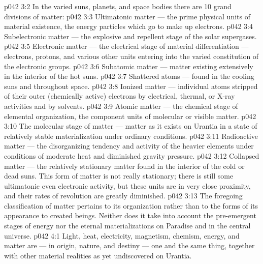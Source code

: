 \vs p042 3:2 In the varied suns, planets, and space bodies there are 10 grand divisions of matter:
\vs p042 3:3 \bibnobreakspace Ultimatonic matter --- the prime physical units of material existence, the energy particles which go to make up electrons.
\vs p042 3:4 \bibnobreakspace Subelectronic matter --- the explosive and repellent stage of the solar supergases.
\vs p042 3:5 \bibnobreakspace Electronic matter --- the electrical stage of material differentiation --- electrons, protons, and various other units entering into the varied constitution of the electronic groups.
\vs p042 3:6 \bibnobreakspace Subatomic matter --- matter existing extensively in the interior of the hot suns.
\vs p042 3:7 \bibnobreakspace Shattered atoms --- found in the cooling suns and throughout space.
\vs p042 3:8 \bibnobreakspace Ionized matter --- individual atoms stripped of their outer (chemically active) electrons by electrical, thermal, or X\hyp{}ray activities and by solvents.
\vs p042 3:9 \bibnobreakspace Atomic matter --- the chemical stage of elemental organization, the component units of molecular or visible matter.
\vs p042 3:10 \bibnobreakspace The molecular stage of matter --- matter as it exists on Urantia in a state of relatively stable materialization under ordinary conditions.
\vs p042 3:11 \bibnobreakspace Radioactive matter --- the disorganizing tendency and activity of the heavier elements under conditions of moderate heat and diminished gravity pressure.
\vs p042 3:12 \bibnobreakspace Collapsed matter --- the relatively stationary matter found in the interior of the cold or dead suns. This form of matter is not really stationary; there is still some ultimatonic even electronic activity, but these units are in very close proximity, and their rates of revolution are greatly diminished.
\vs p042 3:13 \pc The foregoing classification of matter pertains to its organization rather than to the forms of its appearance to created beings. Neither does it take into account the pre\hyp{}emergent stages of energy nor the eternal materializations on Paradise and in the central universe.
\vs p042 4:1 Light, heat, electricity, magnetism, chemism, energy, and matter are --- in origin, nature, and destiny --- one and the same thing, together with other material realities as yet undiscovered on Urantia.
